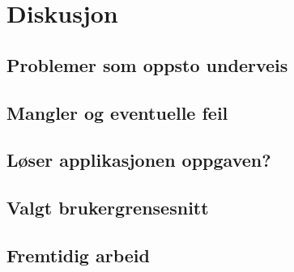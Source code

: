 \chapter[diskusjon]{Diskusjon}

\section{Problemer som oppsto underveis}

\section{Mangler og eventuelle feil}

\section{Løser applikasjonen oppgaven?}

\section{Valgt brukergrensesnitt}

\section{Fremtidig arbeid}
